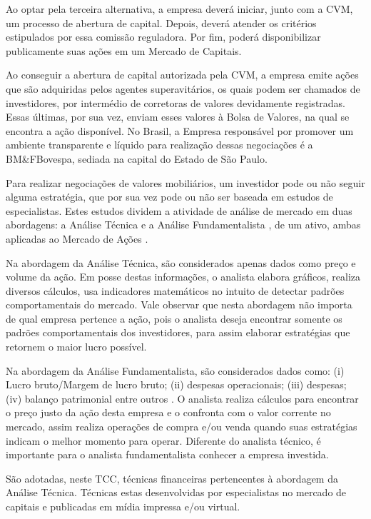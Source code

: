 Ao optar pela terceira alternativa, a empresa deverá iniciar, junto com a CVM, um processo de abertura de capital. Depois, deverá atender os critérios estipulados por essa comissão reguladora. Por fim, poderá disponibilizar publicamente suas ações  em um Mercado de Capitais. 

Ao conseguir a abertura de capital autorizada pela CVM, a empresa emite ações que são adquiridas pelos agentes superavitários, os quais podem ser chamados de investidores, por intermédio de corretoras de valores devidamente registradas. Essas últimas, por sua vez, enviam esses valores à Bolsa de Valores, na qual se encontra a ação disponível. No Brasil, a Empresa responsável por promover um ambiente transparente e líquido para realização dessas negociações é a BM\&FBovespa, sediada na capital do Estado de São Paulo.

Para realizar negociações de valores mobiliários, um investidor pode ou não seguir alguma estratégia, que por sua vez pode ou não ser baseada em estudos de especialistas. Estes estudos dividem a atividade de análise de mercado em duas abordagens: a Análise Técnica \cite{noronha2010} e a Análise Fundamentalista \cite{buffet2010}, de um ativo, ambas aplicadas ao Mercado de Ações .

Na abordagem da Análise Técnica, são considerados apenas dados como preço e volume da ação. Em posse destas informações, o analista elabora gráficos, realiza diversos cálculos, usa indicadores matemáticos no intuito de detectar padrões comportamentais do mercado. Vale observar que nesta abordagem não importa de qual empresa pertence a ação, pois o analista deseja encontrar somente os padrões comportamentais dos investidores, para assim elaborar estratégias que retornem o maior lucro possível.

Na abordagem da Análise Fundamentalista, são considerados dados como: (i) Lucro bruto/Margem de lucro bruto; (ii) despesas operacionais; (iii) despesas; (iv) balanço patrimonial  entre outros \cite{buffet2010}. O analista realiza cálculos para encontrar o preço justo da ação desta empresa e o confronta com o valor corrente no mercado, assim realiza operações de compra e/ou venda quando suas estratégias indicam o melhor momento para operar. Diferente do analista técnico, é importante para o analista fundamentalista conhecer a empresa investida.

São adotadas, neste TCC, técnicas financeiras pertencentes à abordagem da Análise Técnica. Técnicas estas desenvolvidas por especialistas no mercado de capitais e publicadas em mídia impressa e/ou virtual.


